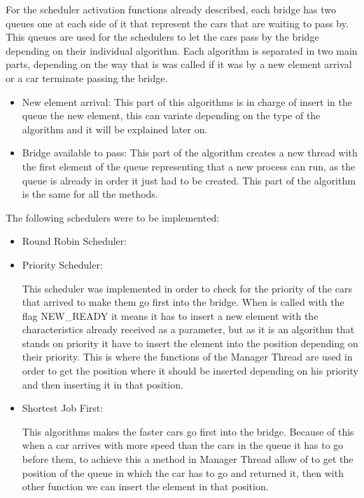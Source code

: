 \documentclass[a4paper,9pt]{article}
\begin{document}
\begin{itemize}
\begin{itemize}
\end{itemize}

For the scheduler activation functions already described, each bridge has two queues one at each side of it that represent the cars that are waiting to pass by. This queues are used for the schedulers to let the cars pass by the bridge depending on their individual algorithm. Each algorithm is separated in two main parts, depending on the way that is was called if it was by a new element arrival or a car terminate passing the bridge.
\begin{itemize}
\item New element arrival: This part of this algorithms is in charge of insert in the queue the new element, this can variate depending on the type of the algorithm and it will be explained later on. 
\item Bridge available to pass: This part of the algorithm creates a new thread with the first element of the queue representing that a new process can run, as the  queue is already in order it just had to be created. This part of the algorithm is the same for all the methods.
\end{itemize}

The following schedulers were to be implemented:
\begin{itemize}
\item Round Robin Scheduler:

\item Priority Scheduler:

This scheduler was implemented in order to check for the priority of the cars that arrived to make them go first into the bridge. When is called with the flag NEW\_READY it means it has to insert a new element with the characteristics already received as a parameter, but as it is an algorithm that stands on priority it have to insert the element into the position depending on their priority. This is where the functions of the Manager Thread are used in order to get the position where it should be inserted depending on his priority and then inserting it in that position.  


\item Shortest Job First:

This algorithms makes the faster cars go first into the bridge. Because of this when a car arrives with more speed than the cars in the queue it has to go before them, to achieve this a method in Manager Thread allow of to get the position of the queue in which the car has to go and returned it, then with other function we can insert the element in that position. 



\end{itemize}
\end{itemize}
\end{document}
